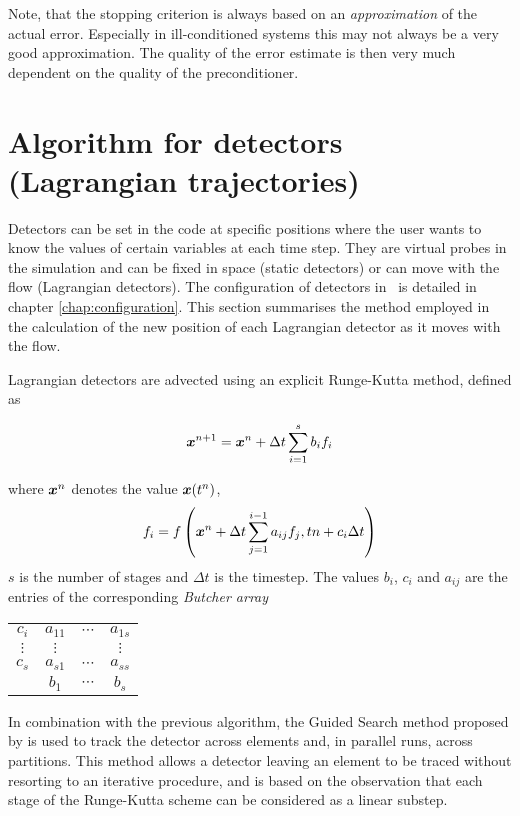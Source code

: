 Note, that the stopping criterion is always based on an \emph{approximation}
of the actual error. Especially in ill-conditioned systems this may not
always be a very good approximation. The quality of the error estimate is
then very much dependent on the quality of the preconditioner.

\section{Algorithm for detectors (Lagrangian trajectories)}
\label{sec:lagrangian_trajectories}
 
Detectors can be set in the code at specific positions where the user wants
to know the values of certain variables at each time step. They are virtual
probes in the simulation and can be fixed in space (static detectors) or can
move with the flow (Lagrangian detectors). The configuration of detectors in
\fluidity\ is detailed in chapter
\ref{chap:configuration}. This section summarises the method
employed in the calculation of the new position of each Lagrangian detector
as it moves with the flow.

Lagrangian detectors are advected using an explicit Runge-Kutta method, defined as

\begin{equation}\label{eq:detectors_RK}
{\mbox{\boldmath$x$}}^{n+1} =  {\mbox{\boldmath$x$}}^{n} + \Delta t \sum_{i=1}^{s} b_i f_i
\end{equation}

where ${\mbox{\boldmath$x$}}^{n}$ denotes the value ${\mbox{\boldmath$x$}}(t^n)$, 
\begin{equation}\label{eq:detectors_RK_fi}
f_i = f \left({\mbox{\boldmath$x$}}^{n}+ \Delta t \sum_{j=1}^{i-1} a_{ij} f_j, t{n}+c_i\Delta t\right)
\end{equation}
$s$ is the number of stages and $\Delta t$ is the timestep. The values $b_i$,
$c_i$ and $a_{ij}$ are the entries of the corresponding \emph{Butcher array}

\begin{center}
\begin{tabular}{ c|c c c }
 $c_i$ & $a_{11}$ & $\cdots$ & $a_{1s}$ \\
 $\vdots$ & $\vdots$ & & $\vdots$ \\
 $c_s$ & $a_{s1}$ & $\cdots$ & $a_{ss}$ \\
\hline
  & $b_1$ & $\cdots$ & $b_s$
\end{tabular}
\end{center}

In combination with the previous algorithm, the Guided Search method proposed by \citet{coppola2001}
is used to track the detector across elements and, in parallel runs, across partitions. 
This method allows a detector leaving an element to be traced without resorting to an iterative procedure,
and is based on the observation that each stage of the Runge-Kutta scheme can be considered as a linear substep.

